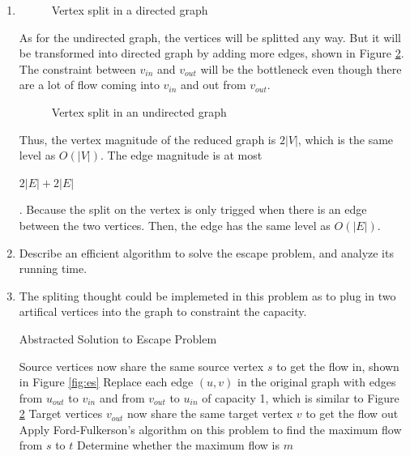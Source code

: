 \documentclass[12pt,a4paper]{article}
\makeatletter
\newtheorem*{solution}{Solution}
\theoremstyle{definition}
\renewenvironment{solution}[1][Solution] {\par\pushQED{\qed}\normalfont\topsep6\p@\@plus6\p@\relax\trivlist\item[\hskip\labelsep\bfseries#1\@addpunct{.}]\ignorespaces}{\popQED\endtrivlist\@endpefalse} \makeatother
\makeatother
\begin{document}
\begin{enumerate}
\begin{enumerate}
\begin{solution}
			\begin{figure}[h]
				\centering
				
				\caption{Vertex split in a directed graph}
				\label{fig:vdir}
			\end{figure}

			As for the undirected graph, the vertices will be splitted any way. But it will be transformed into directed graph by adding more edges, shown in Figure \ref{fig:undir}. The constraint between $v_{in}$ and $v_{out}$ will be the bottleneck even though there are a lot of flow coming into $v_{in}$ and out from $v_{out}$.
			

			\begin{figure}[h]
				\centering
				
				\caption{Vertex split in an undirected graph}
				\label{fig:undir}
			\end{figure}

			Thus, the vertex magnitude of the reduced graph is $2|V|$, which is the same level as $O(|V|)$. The edge magnitude is at most \begin{tcolorbox}[skin=mycross]
				$2|E|+2|E|$
			\end{tcolorbox}. Because the split on the vertex is only trigged when there is an edge between the two vertices. Then, the edge has the same level as $O(|E|)$.

		\end{solution}
        \item Describe an efficient algorithm to solve the escape problem, and analyze its running time.
        \begin{solution}
			The spliting thought could be implemeted in this problem as to plug in two artifical vertices into the graph to constraint the capacity.
			\begin{algorithm}[h]
				\caption{Abstracted Solution to Escape Problem}
				\label{alg:sep}
				Source vertices now share the same source vertex $s$ to get the flow in, shown in Figure \ref{fig:es}\;
				Replace each edge $(u,v)$ in the original graph with edges from $u_{out}$ to $v_{in}$ and from $v_{out}$ to $u_{in}$ of capacity 1, which is similar to Figure \ref{fig:undir}\;
				Target vertices $v_{out}$ now share the same target vertex $v$ to get the flow out\;
				Apply Ford-Fulkerson's algorithm on this problem to find the maximum flow from $s$ to $t$\;
				Determine whether the maximum flow is $m$\;
			\end{algorithm} 
			

\end{solution}
\end{enumerate}
\end{enumerate}
\end{document}
